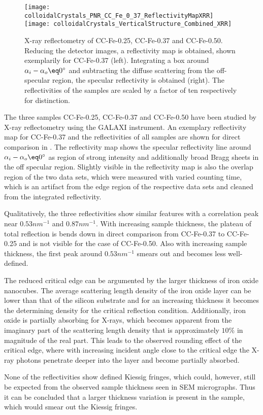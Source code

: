 \documentclass[\main/dresen_thesis.tex]{subfiles}
\begin{document}
  \label{sec:colloidalCrystals:layers:xrr}
  \begin{figure}[tb]
    \centering
    \texttt{[image: colloidalCrystals\_PNR\_CC\_Fe\_0\_37\_ReflectivityMapXRR]}
    \texttt{[image: colloidalCrystals\_VerticalStructure\_Combined\_XRR]}
    \caption{\label{fig:colloidalCrystals:xrr}X-ray reflectometry of CC-Fe-0.25, CC-Fe-0.37 and CC-Fe-0.50. Reducing the detector images, a reflectivity map is obtained, shown exemplarily for CC-Fe-0.37 (left). Integrating a box around $\alpha_i - \alpha_o \eq 0 ^\circ$ and subtracting the diffuse scattering from the off-specular region, the specular reflectivity is obtained (right). The reflectivities of the samples are scaled by a factor of ten respectively for distinction.}
  \end{figure}

  The three samples CC-Fe-0.25, CC-Fe-0.37 and CC-Fe-0.50 have been studied by X-ray reflectometry using the GALAXI instrument.
  An exemplary reflectivity map for CC-Fe-0.37 and the reflectivities of all samples are shown for direct comparison in .
  The reflectivity map shows the specular reflectivity line around $\alpha_i - \alpha_o \eq 0 ^\circ$ as region of strong intensity and additionally broad Bragg sheets in the off specular region.
  Slightly visible in the reflectivity map is also the overlap region of the two data sets, which were measured with varied counting time, which is an artifact from the edge region of the respective data sets and cleaned from the integrated reflectivity.

  Qualitatively, the three reflectivities show similar features with a correlation peak near $0.53 \unit{nm^{-1}}$ and $0.87 \unit{nm^{-1}}$.
  With increasing sample thickness, the plateau of total reflection is bends down in direct comparison from CC-Fe-0.37 to CC-Fe-0.25 and is not visible for the case of CC-Fe-0.50.
  Also with increasing sample thickness, the first peak around $0.53 \unit{nm^{-1}}$ smears out and becomes less well-defined.

  The reduced critical edge can be argumented by the larger thickness of iron oxide nanocubes.
  The average scattering length density of the iron oxide layer can be lower than that of the silicon substrate and for an increasing thickness it becomes the determining density for the critical reflection condition.
  Additionally, iron oxide is partially absorbing for X-rays, which becomes apparent from the imaginary part of the scattering length density that is approximately $10 \%$ in magnitude of the real part.
  This leads to the observed rounding effect of the critical edge, where with increasing incident angle close to the critical edge the X-ray photons penetrate deeper into the layer and become partially absorbed.

  None of the reflectivities show defined Kiessig fringes, which could, however, still be expected from the observed sample thickness seen in SEM micrographs.
  Thus it can be concluded that a larger thickness variation is present in the sample, which would smear out the Kiessig fringes.
\end{document}
